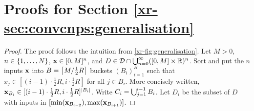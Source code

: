 \documentclass[12pt, twoside]{report}
\newcommand{\xrprefix}[1]{xr-#1}
\begin{document}
\section{Proofs for Section \ref{\xrprefix{sec:convcnps:generalisation}}}
\label{sec:proofs_convcnps:generalisation}

\begin{proof}
    The proof follows the intuition from \cref{\xrprefix{fig:generalisation}}.
    Let $M > 0$, $n \in \set{1, \ldots, N}$, $\vx \in [0, M]^n$, and $D \in \D \cap \union_{n=0}^\infty ([0, M] \times \R)^n$.
    Sort and put the $n$ inputs $\vx$ into $B = \ceil*{M/\tfrac12 R}$ buckets $(B_i)_{i=1}^B$ such that $x_j \in [(i - 1)\cdot \tfrac12 R, i\cdot\tfrac12R]$ for all $j \in B_i$.
    More concisely written, $\vx_{B_i} \in [(i -1)\cdot \tfrac12 R, i\cdot \tfrac12 R]^{\abs{B_i}}$.
    Write $C_i = \union_{j=1}^{i - 1} B_i$.
    Let $D_i$ be the subset of $D$ with inputs in $[\min(\vx_{B_{i-2}}), \max(\vx_{B_{i+1}})]$.
    

\end{proof}
\end{document}
